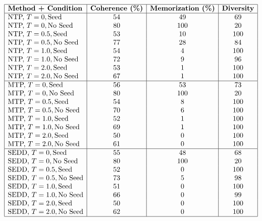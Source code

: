 \documentclass[11pt]{article}
\begin{document}
\[
\begin{array}{|l|c|c|c|}
\hline
\textbf{Method + Condition} & \textbf{Coherence (\%)} & \textbf{Memorization (\%)} & \textbf{Diversity} \\
\hline
\text{NTP, } T=0, \text{Seed}     & 54  & 49   & 69 \\
\text{NTP, } T=0, \text{No Seed}  & 80  & 100  & 20 \\
\text{NTP, } T=0.5, \text{Seed}   & 53  & 10   & 100 \\
\text{NTP, } T=0.5, \text{No Seed}& 77  & 28   & 84 \\
\text{NTP, } T=1.0, \text{Seed}   & 54  & 4    & 100 \\
\text{NTP, } T=1.0, \text{No Seed}& 72  & 9    & 96 \\
\text{NTP, } T=2.0, \text{Seed}   & 53  & 1    & 100 \\
\text{NTP, } T=2.0, \text{No Seed}& 67  & 1    & 100 \\
\hline
\text{MTP, } T=0, \text{Seed}     & 56  & 53   & 73 \\
\text{MTP, } T=0, \text{No Seed}  & 80  & 100  & 20 \\
\text{MTP, } T=0.5, \text{Seed}   & 54  & 8    & 100 \\
\text{MTP, } T=0.5, \text{No Seed}& 70  & 6    & 100 \\
\text{MTP, } T=1.0, \text{Seed}   & 52  & 1    & 100 \\
\text{MTP, } T=1.0, \text{No Seed}& 69  & 1    & 100 \\
\text{MTP, } T=2.0, \text{Seed}   & 50  & 0    & 100 \\
\text{MTP, } T=2.0, \text{No Seed}& 61  & 0    & 100 \\
\hline
\text{SEDD, } T=0, \text{Seed}    & 55  & 48   & 68 \\
\text{SEDD, } T=0, \text{No Seed} & 80  & 100  & 20 \\
\text{SEDD, } T=0.5, \text{Seed}  & 52  & 0    & 100 \\
\text{SEDD, } T=0.5, \text{No Seed}& 73  & 5    & 98 \\
\text{SEDD, } T=1.0, \text{Seed}  & 51  & 0    & 100 \\
\text{SEDD, } T=1.0, \text{No Seed}& 66  & 0    & 99 \\
\text{SEDD, } T=2.0, \text{Seed}  & 50  & 0    & 100 \\
\text{SEDD, } T=2.0, \text{No Seed}& 62  & 0    & 100 \\
\hline
\end{array}
\]
\vspace{1em}
\end{document}
